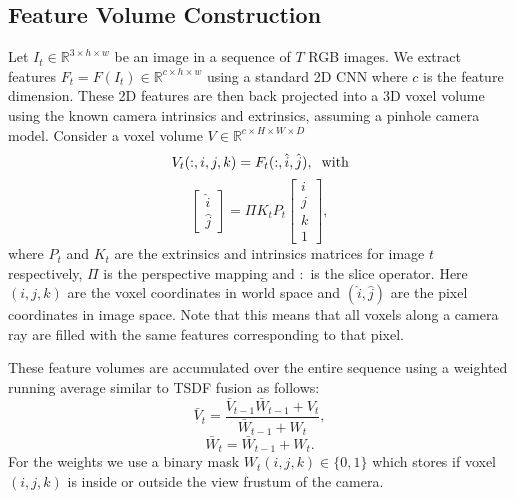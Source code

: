 \documentclass[runningheads]{llncs}
\begin{document}
\subsection{Feature Volume Construction}
Let $I_t \in \mathbb{R}^{3 \times h \times w}$ be an image in a sequence of $T$ RGB images.
We extract features $F_t = F(I_t) \in \mathbb{R}^{c \times h \times w}$ using a standard 2D CNN where $c$ is the feature dimension.
These 2D features are then back projected into a 3D voxel volume using the known camera intrinsics and extrinsics,
assuming a pinhole camera model. Consider a voxel volume $V \in \mathbb{R}^{c \times H \times W \times D}$
\begin{equation}
    V_t(:,i,j,k) = F_t(:,\hat{i},\hat{j}), \hspace{0.2cm}\mathrm{with} 
\end{equation}
\begin{equation}
    \begin{bmatrix}
        \hat{i} \\
        \hat{j}
    \end{bmatrix}
    =
    \Pi K_t P_t
    \begin{bmatrix}
        i \\
        j \\
        k \\
        1
    \end{bmatrix},
\end{equation}
where $P_t$ and $K_t$ are the extrinsics and intrinsics matrices for image $t$ respectively, $\Pi$ is the perspective mapping and $:$ is the slice operator.
Here $(i,j,k)$ are the voxel coordinates in world space and $(\hat{i},\hat{j})$ are the pixel coordinates in image space.
Note that this means that all voxels along a camera ray are filled with the same features corresponding to that pixel.

These feature volumes are accumulated over the entire sequence using a weighted running average similar to TSDF fusion as follows:
\begin{equation}
    \bar{V}_t = \frac{ \bar{V}_{t-1} \bar{W}_{t-1} + V_t }
                     { \bar{W}_{t-1} + W_t},
\end{equation}
\begin{equation}    
    \bar{W}_t = \bar{W}_{t-1} + W_t.
\end{equation}
For the weights we use a binary mask $W_t(i,j,k) \in \{0, 1\}$ which stores if voxel $(i,j,k)$ is inside or outside the view frustum of the camera.
\end{document}
